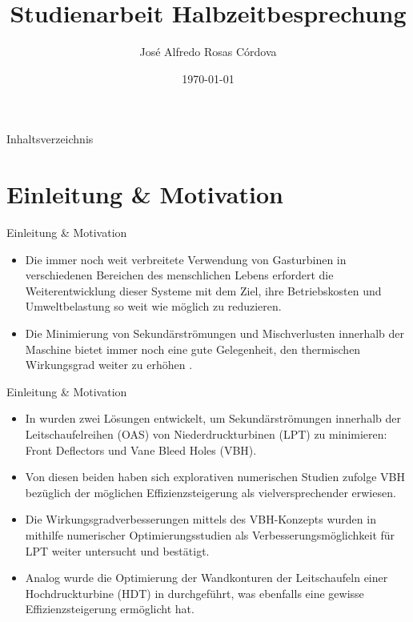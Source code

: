 \documentclass{beamer}
\title{Studienarbeit Halbzeitbesprechung}
\author{José Alfredo Rosas Córdova}
\institute[LUH]{%
	\small Betreut von M.Sc. Josué Inocente Camarero Pueyo\\[1em]
}
\date{\today}
\begin{document}
	
	\begin{frame}[plain]
		\maketitle
	\end{frame}
	
	\begin{frame}{Inhaltsverzeichnis}
		\tableofcontents
	\end{frame}
	
	\section{Einleitung \& Motivation}
	\begin{frame}{Einleitung \& Motivation}
		\begin{itemize}
			\item Die immer noch weit verbreitete Verwendung von Gasturbinen in verschiedenen Bereichen des menschlichen Lebens erfordert die Weiterentwicklung dieser Systeme mit dem Ziel, ihre Betriebskosten und Umweltbelastung so weit wie möglich zu reduzieren.
			
			\item Die Minimierung von Sekundärströmungen und Mischverlusten innerhalb der Maschine bietet immer noch eine gute Gelegenheit, den thermischen Wirkungsgrad weiter zu erhöhen \cite{farokhi2014}.
		\end{itemize}
	\end{frame}
	
	\begin{frame}{Einleitung \& Motivation}
		\begin{itemize}
			\item In \cite{palkus2023low} wurden zwei Lösungen entwickelt, um Sekundärströmungen innerhalb der Leitschaufelreihen (OAS) von Niederdruckturbinen (LPT) zu minimieren: Front Deflectors und Vane Bleed Holes (VBH).
			
			\item Von diesen beiden haben sich explorativen numerischen Studien zufolge VBH bezüglich der möglichen Effizienzsteigerung als vielversprechender erwiesen.
			
			\item Die Wirkungsgradverbesserungen mittels des VBH-Konzepts wurden in \cite{camareropueyo2025reducing,camareropueyo2026comparison,camareropueyo2026robustness} mithilfe numerischer Optimierungsstudien als Verbesserungsmöglichkeit für LPT weiter untersucht und bestätigt.
			
			\item Analog wurde die Optimierung der Wandkonturen der Leitschaufeln einer Hochdruckturbine (HDT) in \cite{Bittner2020} durchgeführt, was ebenfalls eine gewisse Effizienzsteigerung ermöglicht hat.
		\end{itemize}
	\end{frame}
	
\end{document}
